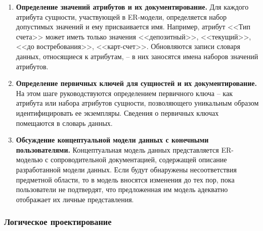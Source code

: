 \begin{enumerate}
\begin{itemize}
		\item значение, принимаемое для атрибута по умолчанию (если такое имеется);
		
		\item может ли атрибут иметь NULL-значения;
		
		\item является ли атрибут составным, и если это так, то из каких простых атрибутов он состоит.
		Например, атрибут <<Ф.И.О. клиента>> может состоять из простых атрибутов <<Фамилия>>, <<Имя>>,
		<<Отчество>>, а может быть простым, содержащим единые значения, как-то <<Сидорский Евгений
		Михайлович>>. Если пользователь не нуждается в доступе к отдельным элементам <<Ф.И.О.>>,
		то атрибут представляется как простой;
		
		\item является ли атрибут расчетным, и если это так, то как вычисляются его значения.
	\end{itemize}
	
	\item \textbf{Определение значений атрибутов и их документирование.}
	Для каждого атрибута сущности, участвующей в ER-модели, определяется набор допустимых значений и ему
	присваивается имя. Например, атрибут <<Тип счета>> может иметь только значения <<депозитный>>, <<текущий>>,
	<<до востребования>>, <<карт-счет>>. Обновляются записи словаря данных, относящиеся к атрибутам, – в них
	заносятся имена наборов значений атрибутов.
	
	\item \textbf{Определение первичных ключей для сущностей и их документирование.}
	На этом шаге руководствуются определением первичного ключа – как атрибута или набора атрибутов сущности,
	позволяющего уникальным образом идентифицировать ее экземпляры. Сведения о первичных ключах помещаются
	в словарь данных.
	
	\item \textbf{Обсуждение концептуальной модели данных с конечными пользователями.}
	Концептуальная модель данных представляется ER-моделью с сопроводительной документацией, содержащей
	описание разработанной модели данных. Если будут обнаружены несоответствия предметной области, то в
	модель вносятся изменения  до тех пор, пока пользователи не подтвердят, что предложенная им модель
	адекватно отображает их личные представления.
\end{enumerate}

\subsubsection{Логическое  проектирование}

